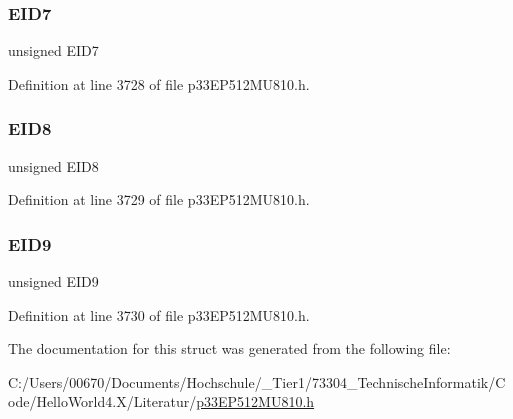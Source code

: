 \subsubsection{\texorpdfstring{E\+I\+D7}{EID7}}
{\footnotesize\ttfamily unsigned E\+I\+D7}



Definition at line 3728 of file p33\+E\+P512\+M\+U810.\+h.

\mbox{\label{structtag_c1_r_x_f0_e_i_d_b_i_t_s_acca25e0b7d86eb499d01f85222baea87}} 
\subsubsection{\texorpdfstring{E\+I\+D8}{EID8}}
{\footnotesize\ttfamily unsigned E\+I\+D8}



Definition at line 3729 of file p33\+E\+P512\+M\+U810.\+h.

\mbox{\label{structtag_c1_r_x_f0_e_i_d_b_i_t_s_ac6748f73d4ada8538b06548be4f396c2}} 
\subsubsection{\texorpdfstring{E\+I\+D9}{EID9}}
{\footnotesize\ttfamily unsigned E\+I\+D9}



Definition at line 3730 of file p33\+E\+P512\+M\+U810.\+h.



The documentation for this struct was generated from the following file\+:\begin{DoxyCompactItemize}
\item 
C\+:/\+Users/00670/\+Documents/\+Hochschule/\+\_\+\+Tier1/73304\+\_\+\+Technische\+Informatik/\+Code/\+Hello\+World4.\+X/\+Literatur/\hyperlink{p33_e_p512_m_u810_8h}{p33\+E\+P512\+M\+U810.\+h}\end{DoxyCompactItemize}

